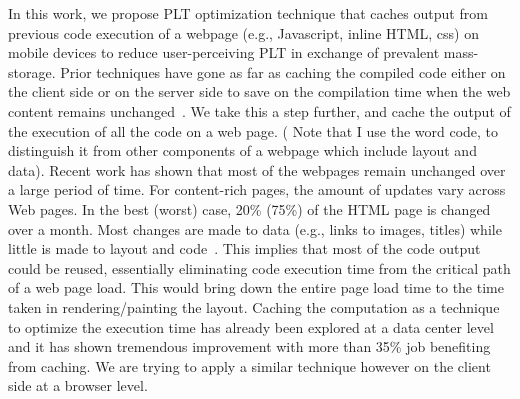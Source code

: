 In this work, we propose PLT optimization technique that caches output
from previous code execution of a webpage (e.g., Javascript, inline
HTML, css) on mobile devices to reduce user-perceiving PLT in exchange
of prevalent mass-storage.
Prior techniques have gone as far as caching the compiled code either
on the client side or on the server side to save on the compilation
time when the web content remains unchanged~\cite{wang2014much}. We
take this a step further, and cache the output of the execution of all
the code on a web page. ( Note that I use the word code, to
distinguish it from other components of a webpage which include layout
and data). Recent work has shown that most of the webpages remain
unchanged over a large period of time. For content-rich pages, the
amount of updates vary across Web pages. In the best (worst) case,
20\% (75\%) of the HTML page is changed over a month. Most changes are
made to data (e.g., links to images, titles) while little is made to
layout and code~\cite{wang2014much}.  This implies that most of the
code output could be reused, essentially eliminating code execution
time from the critical path of a web page load. This would bring down
the entire page load time to the time taken in rendering/painting the
layout. 
Caching the computation as a technique to optimize the execution time has
already been explored at a data center level~\cite{gunda2010nectar} and it has
shown tremendous improvement with more than 35\% job benefiting from caching.
We are trying to apply a similar technique however on the client side at a
browser level. 

